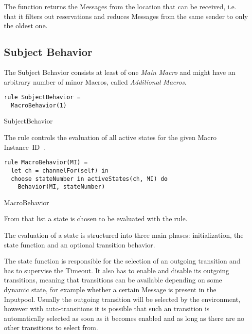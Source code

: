 The function  returns the
Messages from the location  that can be received, i.e. that it
filters out reservations and reduces Messages from the same sender to only
the oldest one.

\subsection{Subject Behavior}

The Subject Behavior consists at least of one \textit{Main Macro}
and might have an arbitrary number of minor Macros, called \textit{Additional Macros}.

\begin{listing}[htbp]
\begin{verbatim}
rule SubjectBehavior =
  MacroBehavior(1)
\end{verbatim}
\caption{SubjectBehavior}
\label{lst:shortasm:SubjectBehavior}
\end{listing}




The  rule controls the evaluation of all active
states for the given Macro Instance~ID~.


\begin{listing}[htbp]
\begin{verbatim}
rule MacroBehavior(MI) =
  let ch = channelFor(self) in
  choose stateNumber in activeStates(ch, MI) do
    Behavior(MI, stateNumber)
\end{verbatim}
\caption{MacroBehavior}
\label{lst:shortasm:MacroBehavior}
\end{listing}

From that list a state  is chosen to be evaluated with the  rule.



The evaluation of a state is structured into three main phases: initialization,
the state function and an optional transition behavior.

The state function is responsible for the selection of an outgoing transition and
has to supervise the Timeout. It also has to enable and disable its outgoing
transitions, meaning that transitions can be available depending on some dynamic state,
for example whether a certain Message is present in the Inputpool.
Usually the outgoing transition will be selected by the environment, however with
auto-transitions it is possible that such an transition is automatically selected as soon
as it becomes enabled and as long as there are no other transitions to select from.


